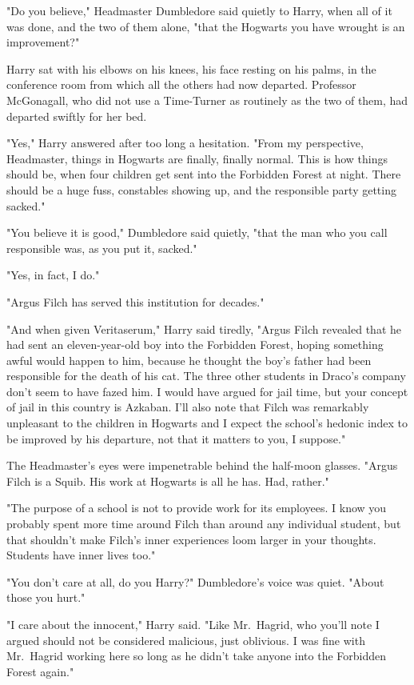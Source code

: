 "Do you believe," Headmaster Dumbledore said quietly to Harry, when all of it 
was done, and the two of them alone, "that the Hogwarts you have wrought is an 
improvement?"

Harry sat with his elbows on his knees, his face resting on his palms, in the 
conference room from which all the others had now departed. Professor 
McGonagall, who did not use a Time-Turner as routinely as the two of them, had 
departed swiftly for her bed.

"Yes," Harry answered after too long a hesitation. "From my perspective, 
Headmaster, things in Hogwarts are finally, finally normal. This is how things 
should be, when four children get sent into the Forbidden Forest at night. 
There should be a huge fuss, constables showing up, and the responsible party 
getting sacked."

"You believe it is good," Dumbledore said quietly, "that the man who you call 
responsible was, as you put it, sacked."

"Yes, in fact, I do."

"Argus Filch has served this institution for decades."

"And when given Veritaserum," Harry said tiredly, "Argus Filch revealed that he 
had sent an eleven-year-old boy into the Forbidden Forest, hoping something 
awful would happen to him, because he thought the boy's father had been 
responsible for the death of his cat. The three other students in Draco's 
company don't seem to have fazed him. I would have argued for jail time, but 
your concept of jail in this country is Azkaban. I'll also note that Filch was 
remarkably unpleasant to the children in Hogwarts and I expect the school's 
hedonic index to be improved by his departure, not that it matters to you, I 
suppose."

The Headmaster's eyes were impenetrable behind the half-moon glasses. "Argus 
Filch is a Squib. His work at Hogwarts is all he has. Had, rather."

"The purpose of a school is not to provide work for its employees. I know you 
probably spent more time around Filch than around any individual student, but 
that shouldn't make Filch's inner experiences loom larger in your thoughts. 
Students have inner lives too."

"You don't care at all, do you Harry?" Dumbledore's voice was quiet. "About 
those you hurt."

"I care about the innocent," Harry said. "Like Mr.~Hagrid, who you'll note I 
argued should not be considered malicious, just oblivious. I was fine with 
Mr.~Hagrid working here so long as he didn't take anyone into the Forbidden 
Forest again."

